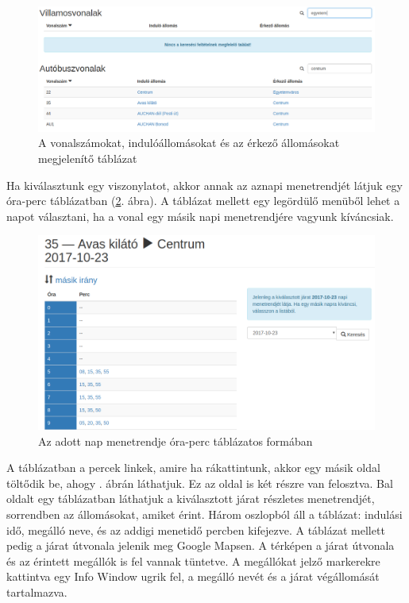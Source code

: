 \begin{figure}[h!]
\centering
\includegraphics[scale=0.32]{kepek/vonalak_tablazat.png}
\caption{A vonalszámokat, indulóállomásokat és az érkező állomásokat megjelenítő táblázat}
\label{fig:vonalak_tablazat}
\end{figure}

Ha kiválasztunk egy viszonylatot, akkor annak az aznapi menetrendjét látjuk egy óra-perc táblázatban (\ref{fig:menetrend}. ábra). A táblázat mellett egy legördülő menüből lehet a napot választani, ha a vonal egy másik napi menetrendjére vagyunk kíváncsiak.

\begin{figure}[h!]
\centering
\includegraphics[scale=0.4]{kepek/menetrend.png}
\caption{Az adott nap menetrendje óra-perc táblázatos formában}
\label{fig:menetrend}
\end{figure}

A táblázatban a percek linkek, amire ha rákattintunk, akkor egy másik oldal töltődik be, ahogy . ábrán láthatjuk. Ez az oldal is két részre van felosztva. Bal oldalt egy táblázatban láthatjuk a kiválasztott járat részletes menetrendjét, sorrendben az állomásokat, amiket érint. Három oszlopból áll a táblázat: indulási idő, megálló neve, és az addigi menetidő percben kifejezve. A táblázat mellett pedig a járat útvonala jelenik meg Google Mapsen. A térképen a járat útvonala és az érintett megállók is fel vannak tüntetve. A megállókat jelző markerekre kattintva egy Info Window ugrik fel, a megálló nevét és a járat végállomását tartalmazva.

